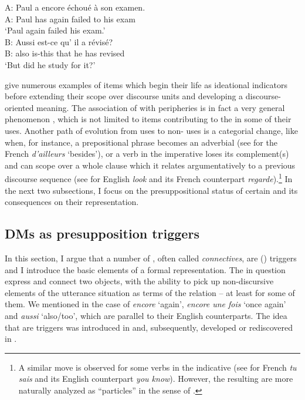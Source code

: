 \documentclass[output=paper,colorlinks,citecolor=brown]{langscibook}
\begin{document}
\ea
\label{iterative-additive3:Jayez}
\gll A: Paul a encore échoué à son examen.\\
A: Paul has again failed to his exam\\
\glt `Paul again failed his exam.'\\
\gll B: Aussi est-ce qu' il a révisé?\\
B: also is-this that he has revised\\
\glt `But did he study for it?'
\z


\citet{Heineetal:2021} give numerous examples of items which begin their life as ideational indicators before extending their scope over discourse units and developing a discourse-oriented meaning. The association of  with peripheries is in fact a very general phenomenon \citep{vanolmenandSink}, which is not limited to items contributing to the  in some of their uses. Another path of evolution from  uses to non- uses is a categorial change, like when, for instance, a prepositional phrase becomes an adverbial  (see \citealt{FagardandCharolles:2018} for the French \textit{d'ailleurs} `besides'), or a verb in the imperative loses its complement(s) and can scope over a whole clause which it relates argumentatively to a previous discourse sequence (see \citealt{Brinton:1996,Traugott:2018a,Dostie:2004} for English \textit{look} and its French counterpart \textit{regarde}).\footnote{A similar move is observed for some verbs in the indicative (see \citealt{Andersen:2007,Brinton:2008} for French \textit{tu sais} and its English counterpart \textit{you know}). However, the resulting  are more naturally analyzed as ``particles'' in the sense of .} In the next two subsections, I focus on the presuppositional status of certain  and its consequences on their representation.




\subsection{DMs as presupposition triggers}
\label{sec-DM-as-PP-triggers:Jayez}

In this section, I argue that a number of , often called \textit{connectives}, are  () triggers and I introduce the basic elements of a formal representation. The  in question express  and connect two objects, with the ability to pick up non-discursive elements of the utterance situation as terms of the relation -- at least for some of them. We mentioned in  the case of \textit{encore} `again', \textit{encore une fois} `once again' and \textit{aussi} `also/too', which are parallel to their English counterparts. The idea that   are  triggers was introduced in \citet{Jayez:2004a} and, subsequently, developed or rediscovered in \citet{DargnatandJayez:2020,Pavese:2023,Stokke:2017}.
\end{document}
